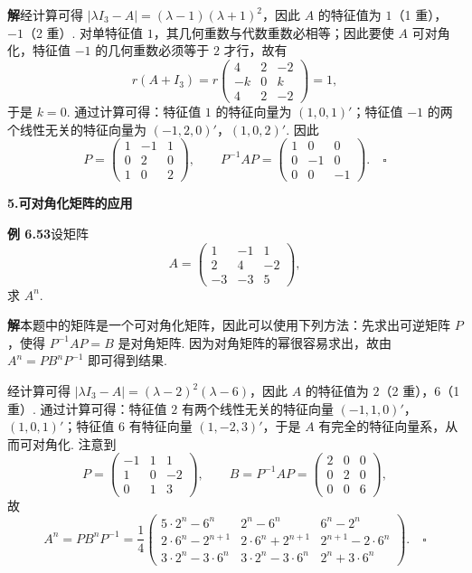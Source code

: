 \documentclass[UTF8,12pt,a4paper,fontset=fandol]{ctexart}
\begin{document}
\noindent\textbf{解}\quad 经计算可得 $|\lambda I_3-A|=(\lambda-1)(\lambda+1)^2$，因此 $A$ 的特征值为 $1$（1 重），$-1$（2 重）. 对单特征值 $1$，其几何重数与代数重数必相等；因此要使 $A$ 可对角化，特征值 $-1$ 的几何重数必须等于 $2$ 才行，故有
\[
r(A+I_3)=r\left(\begin{array}{ccc}
4 & 2 & -2\\
-k & 0 & k\\
4 & 2 & -2
\end{array}\right)=1,
\]
于是 $k=0$. 通过计算可得：特征值 $1$ 的特征向量为 $(1,0,1)'$；特征值 $-1$ 的两个线性无关的特征向量为 $(-1,2,0)'$，$(1,0,2)'$. 因此
\[
P=\left(\begin{array}{ccc}
1 & -1 & 1\\
0 & 2 & 0\\
1 & 0 & 2
\end{array}\right),\qquad
P^{-1}AP=\left(\begin{array}{ccc}
1 & 0 & 0\\
0 & -1 & 0\\
0 & 0 & -1
\end{array}\right). \quad \square
\]

\noindent\textbf{5.\quad 可对角化矩阵的应用}

\noindent\textbf{例 6.53}\quad 设矩阵
\[
A=\left(\begin{array}{ccc}
1 & -1 & 1\\
2 & 4 & -2\\
-3 & -3 & 5
\end{array}\right),
\]
求 $A^n$.

\noindent\textbf{解}\quad 本题中的矩阵是一个可对角化矩阵，因此可以使用下列方法：先求出可逆矩阵 $P$，使得 $P^{-1}AP=B$ 是对角矩阵. 因为对角矩阵的幂很容易求出，故由 $A^n=PB^nP^{-1}$ 即可得到结果.

经计算可得 $|\lambda I_3-A|=(\lambda-2)^2(\lambda-6)$，因此 $A$ 的特征值为 $2$（2 重），$6$（1 重）. 通过计算可得：特征值 $2$ 有两个线性无关的特征向量 $(-1,1,0)'$，$(1,0,1)'$；特征值 $6$
有特征向量 $(1,-2,3)'$，于是 $A$ 有完全的特征向量系，从而可对角化. 注意到
\[
P=\left(\begin{array}{ccc}
-1 & 1 & 1\\
1 & 0 & -2\\
0 & 1 & 3
\end{array}\right),\qquad
B=P^{-1}AP=\left(\begin{array}{ccc}
2 & 0 & 0\\
0 & 2 & 0\\
0 & 0 & 6
\end{array}\right),
\]
故
\[
A^n=PB^nP^{-1}
=\frac{1}{4}\left(\begin{array}{ccc}
5\cdot 2^n-6^n & 2^n-6^n & 6^n-2^n\\
2\cdot 6^n-2^{n+1} & 2\cdot 6^n+2^{n+1} & 2^{n+1}-2\cdot 6^n\\
3\cdot 2^n-3\cdot 6^n & 3\cdot 2^n-3\cdot 6^n & 2^n+3\cdot 6^n
\end{array}\right). \quad \square
\]
\end{document}
